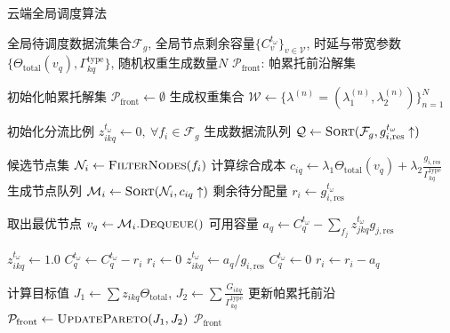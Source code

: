 \begin{breakablealgorithm}
\caption{云端全局调度算法}
\label{alg:enhanced_global}
\begin{algorithmic}[1]
\REQUIRE  
  全局待调度数据流集合$\mathcal{F}_g$, 全局节点剩余容量$\{C^{t_\omega}_v\}_{v \in \mathcal{V}}$, 时延与带宽参数$\{\Theta_{\text{total}}(v_q), \Gamma_{kq}^{\text{type}}\}$, 随机权重生成数量$N$
\ENSURE  
  $\mathcal{P}_{\text{front}}$: 帕累托前沿解集  

\STATE 初始化帕累托解集 $\mathcal{P}_{\text{front}} \leftarrow \emptyset$
\STATE 生成权重集合 $\mathcal{W} \leftarrow \{\lambda^{(n)}=(\lambda_1^{(n)}, \lambda_2^{(n)})\}_{n=1}^N$ 

  \STATE 初始化分流比例 $z_{ikq}^{t_\omega} \leftarrow 0,\ \forall f_i \in \mathcal{F}_g$  
  \STATE 生成数据流队列 $\mathcal{Q} \leftarrow \textsc{Sort}(\mathcal{F}_g, g_{i,\text{res}}^{t_\omega} \uparrow)$ 

    \STATE 候选节点集 $\mathcal{N}_i \leftarrow \textsc{FilterNodes}(f_i)$  
    \STATE 计算综合成本 $c_{iq} \leftarrow \lambda_1\Theta_{\text{total}}(v_q) + \lambda_2\frac{g_{i,\text{res}}}{\Gamma_{kq}^{\text{type}}}$
    \STATE 生成节点队列 $\mathcal{M}_i \leftarrow \textsc{Sort}(\mathcal{N}_i, c_{iq} \uparrow)$
    \STATE 剩余待分配量 $r_i \leftarrow g_{i,\text{res}}^{t_\omega}$
    
      \STATE 取出最优节点 $v_q \leftarrow \mathcal{M}_i.\textsc{Dequeue}()$
      \STATE 可用容量 $a_q \leftarrow C^{t_\omega}_q - \sum_{f_j} z_{jkq}^{t_\omega}g_{j,\text{res}}$
      
        \STATE $z_{ikq}^{t_\omega} \leftarrow 1.0$ 
        \STATE $C^{t_\omega}_q \leftarrow C^{t_\omega}_q - r_i$
        \STATE $r_i \leftarrow 0$
      \ELSE
          \STATE $z_{ikq}^{t_\omega} \leftarrow a_q / g_{i,\text{res}}$ 
          \STATE $C^{t_\omega}_q \leftarrow 0$
          \STATE $r_i \leftarrow r_i - a_q$
        \ENDIF
      \ENDIF
    \ENDWHILE
  \ENDFOR
  
  \STATE 计算目标值 $J_1 \leftarrow \sum z_{ikq}\Theta_{\text{total}}$, $J_2 \leftarrow \sum \frac{G_{ikq}}{\Gamma_{kq}^{\text{type}}}$  
  \STATE 更新帕累托前沿 $\mathcal{P}_{\text{front}} \leftarrow \textsc{UpdatePareto}(J_1, J_2)$
\ENDFOR
\RETURN $\mathcal{P}_{\text{front}}$
\end{algorithmic}
\end{breakablealgorithm}

